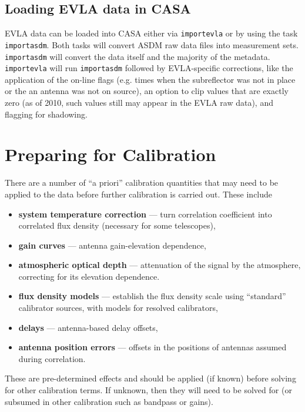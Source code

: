 \subsection{Loading EVLA data in CASA}
\label{section:cal.flow.evla}

EVLA data can be loaded into CASA either via {\tt importevla} or by
using the task {\tt importasdm}. Both tasks will convert ASDM raw data
files into measurement sets. {\tt importasdm} will convert the data
itself and the majority of the metadata. {\tt importevla} will run
{\tt importasdm} followed by EVLA-specific corrections, like the
application of the on-line flags (e.g. times when the subreflector was
not in place or the an antenna was not on source), an option to clip
values that are exactly zero (as of 2010, such values still may appear
in the EVLA raw data), and flagging for shadowing.


\section{Preparing for Calibration}
\label{section:cal.prior}

There are a number of ``a priori'' calibration quantities that
may need to be applied to the data before further calibration
is carried out.  These include
\begin{itemize}
   \item {\bf system temperature correction} --- turn correlation
      coefficient into correlated flux density (necessary for some
      telescopes),
   \item {\bf gain curves} --- antenna gain-elevation dependence,
   \item {\bf atmospheric optical depth} --- attenuation of the signal
      by the atmosphere, correcting for its elevation dependence.
   \item {\bf flux density models} --- establish the flux density
      scale using ``standard'' calibrator sources, with models for
      resolved calibrators,
   \item {\bf delays} --- antenna-based delay offsets,
   \item {\bf antenna position errors} --- offsets in the positions of
      antennas assumed during correlation.
\end{itemize}
These are pre-determined effects and should be applied (if known) before
solving for other calibration terms.  If unknown, then they will
need to be solved for (or subsumed in other calibration such as 
bandpass or gains).

